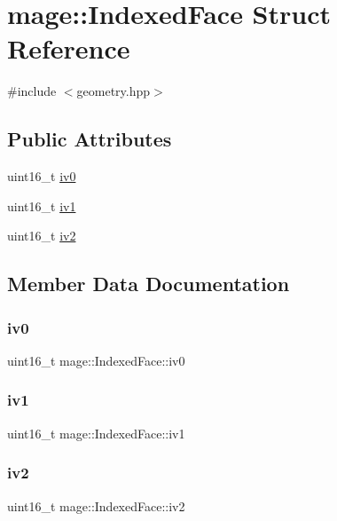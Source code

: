\hypertarget{structmage_1_1_indexed_face}{}\section{mage\+:\+:Indexed\+Face Struct Reference}
\label{structmage_1_1_indexed_face}


{\ttfamily \#include $<$geometry.\+hpp$>$}

\subsection*{Public Attributes}
\begin{DoxyCompactItemize}
\item 
uint16\+\_\+t \hyperlink{structmage_1_1_indexed_face_a26f197abbbe88a457f3e8666a6860f77}{iv0}
\item 
uint16\+\_\+t \hyperlink{structmage_1_1_indexed_face_a4d68d25c6af658d77e485df16136495d}{iv1}
\item 
uint16\+\_\+t \hyperlink{structmage_1_1_indexed_face_ae0e96f9c46f47c7d02da18eb04f497ff}{iv2}
\end{DoxyCompactItemize}


\subsection{Member Data Documentation}
\hypertarget{structmage_1_1_indexed_face_a26f197abbbe88a457f3e8666a6860f77}{}\label{structmage_1_1_indexed_face_a26f197abbbe88a457f3e8666a6860f77} 
\subsubsection{\texorpdfstring{iv0}{iv0}}
{\footnotesize\ttfamily uint16\+\_\+t mage\+::\+Indexed\+Face\+::iv0}

\hypertarget{structmage_1_1_indexed_face_a4d68d25c6af658d77e485df16136495d}{}\label{structmage_1_1_indexed_face_a4d68d25c6af658d77e485df16136495d} 
\subsubsection{\texorpdfstring{iv1}{iv1}}
{\footnotesize\ttfamily uint16\+\_\+t mage\+::\+Indexed\+Face\+::iv1}

\hypertarget{structmage_1_1_indexed_face_ae0e96f9c46f47c7d02da18eb04f497ff}{}\label{structmage_1_1_indexed_face_ae0e96f9c46f47c7d02da18eb04f497ff} 
\subsubsection{\texorpdfstring{iv2}{iv2}}
{\footnotesize\ttfamily uint16\+\_\+t mage\+::\+Indexed\+Face\+::iv2}

